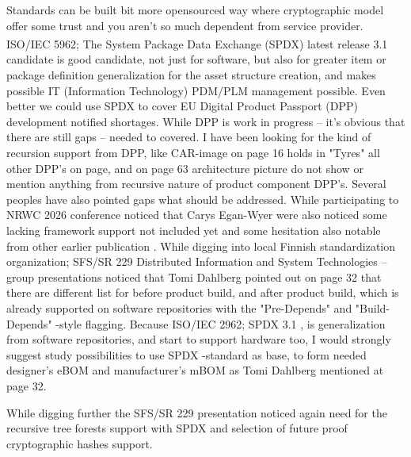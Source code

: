 Standards can be built bit more opensourced way where cryptographic
model offer some trust\allowbreak\cite{PostQuantum} and you aren't so much
dependent from service provider. ISO/IEC 5962; The System Package Data
Exchange\textsuperscript{\texttrademark} (SPDX\textregistered)\cite{SPDX}
latest release 3.1 candidate is good candidate, not just for software, but
also for greater item or package definition generalization for the asset
structure creation, and makes possible IT (Information Technology)
PDM\allowbreak\cite{PDM}/PLM\allowbreak\cite{PLM}
management possible. Even better we could use SPDX to cover EU Digital
Product Passport (DPP) development notified shortages. While DPP is work
in progress -- it's obvious that there are still gaps -- needed to covered.
I have been looking for the kind of recursion support from
DPP\allowbreak\cite{dpp-final_rev20260625}, like CAR-image on page 16 holds
in "Tyres" all other DPP's on page, and on page 63 architecture picture do
not show or mention anything from recursive nature of product component
DPP's. Several peoples have also pointed gaps what should be addressed.
While participating to NRWC 2026 conference noticed that Carys Egan-Wyer
\cite{Carys202611061000} were also noticed some lacking framework support
not included yet and some hesitation also notable from other earlier
publication \cite{Carys20260427}. While digging into local Finnish
standardization organization; SFS/SR 229 Distributed Information and
System Technologies -- group presentations noticed that Tomi Dahlberg
pointed out \cite{SFS_SR229_202608261337} on page 32 that there are
different list for before product build, and after product build, which
is already supported on software repositories with the "Pre-Depends"
and "Build-Depends" -style flagging\allowbreak\cite{
DebianPolicyManualRelationships}. Because ISO/IEC 2962; SPDX 3.1
\cite{SPDX}, is generalization from software repositories, and start to
support hardware too, I would strongly suggest study possibilities to use
SPDX -standard as base, to form needed designer's eBOM and manufacturer's
mBOM as Tomi Dahlberg mentioned\allowbreak\cite{SFS_SR229_202608261337}
at page 32.

While digging further the SFS/SR 229 presentation noticed again need
for the recursive tree forests support
\cite{SFS_SR229_202608261504}\cite{SFS_SR229_202608261510} with
SPDX \cite{SPDX} and selection of future proof cryptographic hashes
\cite{PostQuantum}\cite{CompHashFunc} support.
\\

